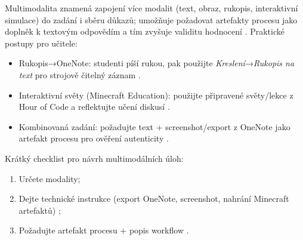 Multimodalita znamená zapojení více modalit (text, obraz, rukopis, interaktivní simulace) do zadání i sběru důkazů; umožňuje požadovat artefakty procesu jako doplněk k textovým odpovědím a tím zvyšuje validitu hodnocení \cite{kb_ai_101_tipu_pdf_04e4a115_page_8_1}.
Praktické postupy pro učitele: \begin{itemize}
\item Rukopis→OneNote: studenti píší rukou, pak použijte \textit{Kreslení}→\textit{Rukopis na text} pro strojově čitelný záznam \cite{kb_ai_101_tipu_pdf_04e4a115_page_13_2}.
\item Interaktivní světy (Minecraft Education): použijte připravené světy/lekce z Hour of Code a reflektujte učení diskusí \cite{kb_ai_101_tipu_pdf_04e4a115_page_15_2}.
\item Kombinovaná zadání: požadujte text + screenshot/export z OneNote jako artefakt procesu pro ověření autenticity \cite{kb_ai_101_tipu_pdf_04e4a115_page_8_1,kb_ai_101_tipu_pdf_04e4a115_page_13_2}.
\end{itemize}
Krátký checklist pro návrh multimodálních úloh: \begin{enumerate}
\item Určete modality; \item Dejte technické instrukce (export OneNote, screenshot, nahrání Minecraft artefaktů) \cite{kb_ai_101_tipu_pdf_04e4a115_page_13_2,kb_ai_101_tipu_pdf_04e4a115_page_15_2}; \item Požadujte artefakt procesu + popis workflow \cite{kb_ai_101_tipu_pdf_04e4a115_page_8_1}.
\end{enumerate}